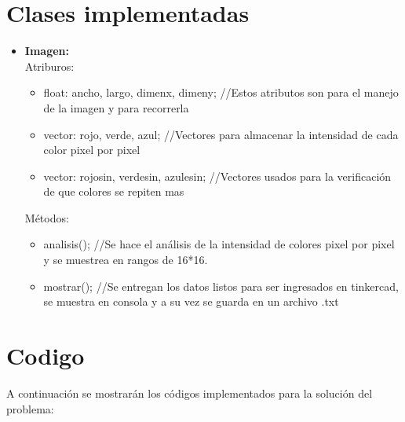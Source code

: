 \documentclass{article}
\begin{document}
\section{Clases implementadas} \label{contenido}
\begin{itemize}
\item \textbf{Imagen:} \\
Atriburos: \begin{itemize}
\item float: ancho, largo, dimenx, dimeny; //Estos atributos son para el manejo de la imagen y para recorrerla
\item vector: rojo, verde, azul; //Vectores para almacenar la intensidad de cada color pixel por pixel
\item vector: rojosin, verdesin, azulesin; //Vectores usados para la verificación de que colores se repiten mas
        \end{itemize}

Métodos:
    \begin{itemize}
        \item analisis(); //Se hace el análisis de la intensidad de colores pixel por pixel y se muestrea en rangos de 16*16.
        \item mostrar(); //Se entregan los datos listos para ser ingresados en tinkercad, se muestra en consola y a su vez se guarda en un archivo .txt
    \end{itemize}

\end{itemize}

\section{Codigo} \label{contenido}
A continuación se mostrarán los códigos implementados para la solución del problema:
\end{document}
